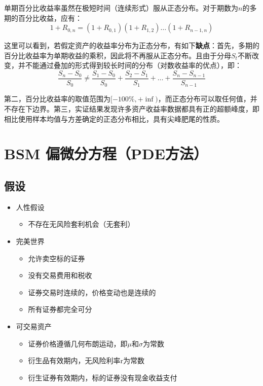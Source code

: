 \documentclass[11pt]{article}
\begin{document}
单期百分比收益率虽然在极短时间（连续形式）服从正态分布。对于期数为$n$的多期的百分比收益，应有：
\begin{equation*}
    1+R_{0,n} = (1+R_{0,1})(1+R_{1,2})\dots(1+R_{n-1,n})
\end{equation*}

这里可以看到，若假定资产的收益率分布为正态分布，有如下\textbf{缺点}：首先，多期的百分比收益率为单期收益的乘积，因此将不再服从正态分布。且由于分母$S_t$不断改变，并不能通过叠加的形式得到较长时间的分布（对数收益率的优点），即：
\begin{equation*}
    \frac{S_n - S_0}{S_0} \neq \frac{S_1- S_0}{S_0} + \frac{S_2-S_1}{S_1} + \dots + \frac{S_{n}-S_{n-1}}{S_{n-1}}
\end{equation*}

第二，百分比收益率的取值范围为$[-100\%,+\inf)$，而正态分布可以取任何值，并不存在下边界。第三，实证结果发现许多资产收益率数据都具有正的超额峰度，即相比使用样本均值与方差确定的正态分布相比，具有尖峰肥尾的性质。

\section{BSM 偏微分方程（PDE方法）}

\subsection{假设}
\begin{itemize}
    \item 人性假设
    \begin{itemize}[leftmargin=2em]
        \item 不存在无风险套利机会（无套利）
    \end{itemize}
    \item 完美世界
    \begin{itemize}
        \item 允许卖空标的证券
        \item 没有交易费用和税收
        \item 证券交易时连续的，价格变动也是连续的
        \item 所有证券都完全可分
    \end{itemize}
    \item 可交易资产
        \begin{itemize}
            \item 证券价格遵循几何布朗运动，即$\mu$和$\sigma$为常数
            \item 衍生品有效期内，无风险利率r为常数
            \item 衍生证券有效期内，标的证券没有现金收益支付
        \end{itemize}
\end{itemize}
\end{document}
